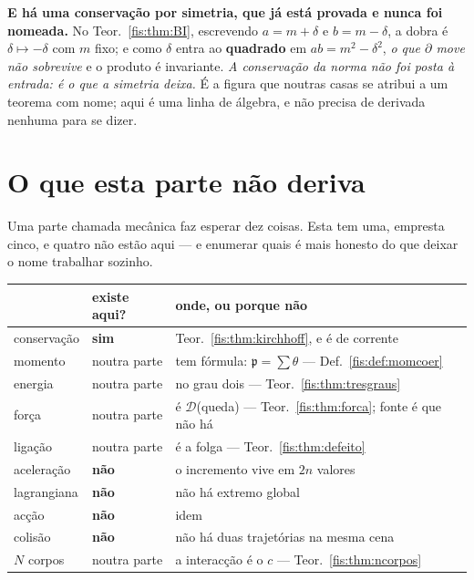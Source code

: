 \documentclass[livro.tex]{subfiles}
\begin{document}
\medskip\noindent\textbf{E há uma conservação por simetria, que já está provada e
nunca foi nomeada.} No Teor.~\ref{fis:thm:BI}, escrevendo $a=m+\delta$ e
$b=m-\delta$, a dobra é $\delta\mapsto-\delta$ com $m$ fixo; e como $\delta$ entra
ao \textbf{quadrado} em $ab=m^{2}-\delta^{2}$, \emph{o que $\partial$ move não
sobrevive} e o produto é invariante. \emph{A conservação da norma não foi posta à
entrada: é o que a simetria deixa.} É a figura que noutras casas se atribui a um
teorema com nome; aqui é uma linha de álgebra, e não precisa de derivada nenhuma
para se dizer.

\section{O que esta parte não deriva}\label{fis:mec-naoderiva}

\noindent Uma parte chamada mecânica faz esperar dez coisas. Esta tem uma,
empresta cinco, e quatro não estão aqui --- e enumerar quais é mais honesto do que
deixar o nome trabalhar sozinho.

\begin{center}\small
\begin{tabular}{@{}lll@{}}
\toprule
 & existe aqui? & onde, ou porque não \\
\midrule
conservação & \textbf{sim} & Teor.~\ref{fis:thm:kirchhoff}, e é de corrente \\
momento & noutra parte & tem fórmula: $\mathfrak{p}=\sum\theta$ --- Def.~\ref{fis:def:momcoer} \\
energia & noutra parte & no grau dois --- Teor.~\ref{fis:thm:tresgraus} \\
força & noutra parte & é $\mathcal{D}$(queda) --- Teor.~\ref{fis:thm:forca}; fonte é que não há \\
ligação & noutra parte & é a folga --- Teor.~\ref{fis:thm:defeito} \\
aceleração & \textbf{não} & o incremento vive em $2n$ valores \\
lagrangiana & \textbf{não} & não há extremo global \\
acção & \textbf{não} & idem \\
colisão & \textbf{não} & não há duas trajetórias na mesma cena \\
$N$ corpos & noutra parte & a interacção é o $c$ --- Teor.~\ref{fis:thm:ncorpos} \\
\bottomrule
\end{tabular}
\end{center}
\end{document}
